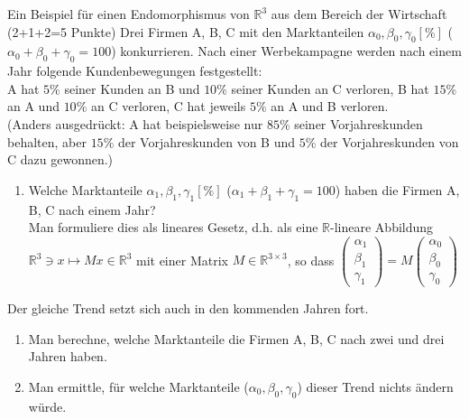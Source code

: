 \documentclass{uebblatt}
\begin{document}
\begin{aufgabe}{Ein Beispiel für einen Endomorphismus von $\mathbb{R}^3$ aus dem Bereich der Wirtschaft (2+1+2=5 Punkte)}
Drei Firmen A, B, C mit den Marktanteilen $\alpha_0, \beta_0, \gamma_0[\%]$ ($\alpha_0 + \beta_0 + \gamma_0 = 100$) konkurrieren. Nach einer Werbekampagne werden nach einem Jahr folgende Kundenbewegungen festgestellt:\\
A hat $5\%$ seiner Kunden an B und $10\%$ seiner Kunden an C verloren, B hat $15\%$ an A und $10\%$ an C verloren, C hat jeweils $5\%$ an A und B verloren.\\
(Anders ausgedrückt: A hat beispielsweise nur $85\%$ seiner Vorjahreskunden behalten, aber $15\%$ der Vorjahreskunden von B und $5\%$ der Vorjahreskunden von C dazu gewonnen.)
\begin{enumerate}
\item Welche Marktanteile $\alpha_1, \beta_1, \gamma_1 [\%]$ ($\alpha_1 + \beta_1 + \gamma_1 = 100$) haben die Firmen A, B, C nach einem Jahr? \\
Man formuliere dies als lineares Gesetz, d.h. als eine $\mathbb{R}$-lineare Abbildung\break $\mathbb{R}^3 \ni x \mapsto Mx \in \mathbb{R}^3$ mit einer Matrix $M \in \mathbb{R}^{3 \times 3}$, so dass $\begin{pmatrix}\alpha_1\\\beta_1\\\gamma_1\end{pmatrix} = M \begin{pmatrix}\alpha_0\\\beta_0\\\gamma_0\end{pmatrix}$
\end{enumerate}
Der gleiche Trend setzt sich auch in den kommenden Jahren fort.
\begin{enumerate}[resume]
\item Man berechne, welche Marktanteile die Firmen A, B, C nach zwei und drei Jahren haben.
\item Man ermittle, für welche Marktanteile ($\alpha_0, \beta_0, \gamma_0$) dieser Trend nichts ändern würde.
\end{enumerate}
\end{aufgabe}
\end{document}
